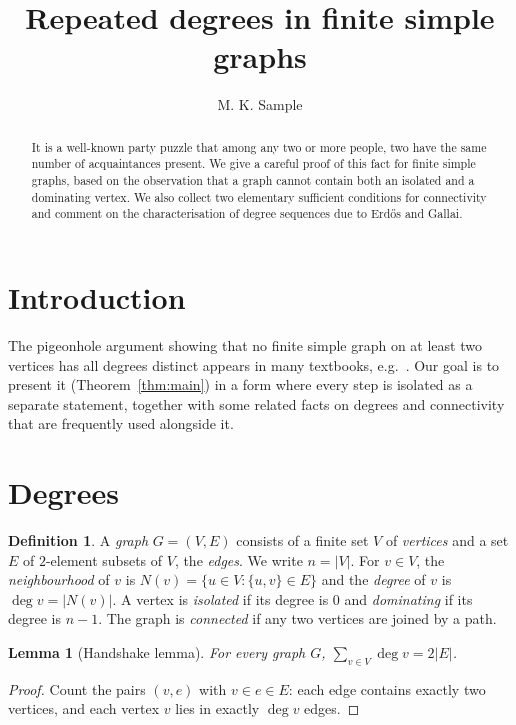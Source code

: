 \documentclass[11pt]{amsart}
\title{Repeated degrees in finite simple graphs}
\author{M. K. Sample}
\date{}
\newtheorem{lemma}[theorem]{Lemma}
\theoremstyle{definition}
\newtheorem{definition}[theorem]{Definition}
\theoremstyle{remark}
\begin{document}
\begin{abstract}
It is a well-known party puzzle that among any two or more people, two have
the same number of acquaintances present. We give a careful proof of this fact
for finite simple graphs, based on the observation that a graph cannot contain
both an isolated and a dominating vertex. We also collect two elementary
sufficient conditions for connectivity and comment on the characterisation of
degree sequences due to Erd\H{o}s and Gallai.
\end{abstract}

\maketitle

\section{Introduction}

The pigeonhole argument showing that no finite simple graph on at least two
vertices has all degrees distinct appears in many textbooks, e.g.~\cite{Bol}.
Our goal is to present it (Theorem~\ref{thm:main}) in a form where every
step is isolated as a separate statement, together with some related facts on
degrees and connectivity that are frequently used alongside it.

\section{Degrees}

\begin{definition}\label{def:graph}
A \emph{graph} $G=(V,E)$ consists of a finite set $V$ of \emph{vertices} and a
set $E$ of $2$-element subsets of $V$, the \emph{edges}. We write $n=|V|$. For
$v\in V$, the \emph{neighbourhood} of $v$ is $N(v)=\{u\in V:\{u,v\}\in E\}$ and
the \emph{degree} of $v$ is $\deg v=|N(v)|$. A vertex is \emph{isolated} if its
degree is $0$ and \emph{dominating} if its degree is $n-1$. The graph is
\emph{connected} if any two vertices are joined by a path.
\end{definition}

\begin{lemma}[Handshake lemma]\label{lem:hand}
For every graph $G$, $\sum_{v\in V}\deg v=2|E|$.
\end{lemma}

\begin{proof}
Count the pairs $(v,e)$ with $v\in e\in E$: each edge contains exactly two
vertices, and each vertex $v$ lies in exactly $\deg v$ edges.
\end{proof}
\end{document}

